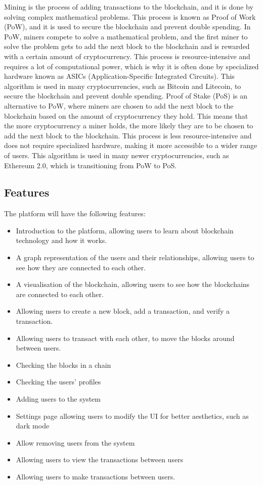 \documentclass[12pt, a4paper]{article}
\begin{document}
Mining is the process of adding transactions to the blockchain, and it is done by solving complex mathematical problems.
This process is known as Proof of Work (PoW), and it is used to secure the blockchain and prevent double spending.
In PoW, miners compete to solve a mathematical problem, and the first miner to solve the problem gets to add the next block to the blockchain and is rewarded with a certain amount of cryptocurrency.
This process is resource-intensive and requires a lot of computational power, which is why it is often done by specialized hardware known as ASICs (Application-Specific Integrated Circuits). 
This algorithm is used in many cryptocurrencies, such as Bitcoin and Litecoin, to secure the blockchain and prevent double spending.
Proof of Stake (PoS) is an alternative to PoW, where miners are chosen to add the next block to the blockchain based on the amount of cryptocurrency they hold.
This means that the more cryptocurrency a miner holds, the more likely they are to be chosen to add the next block to the blockchain.
This process is less resource-intensive and does not require specialized hardware, making it more accessible to a wider range of users.
This algorithm is used in many newer cryptocurrencies, such as Ethereum 2.0, which is transitioning from PoW to PoS.


\newpage
\subsection{Features}
The platform will have the following features:
\begin{itemize}
    \item Introduction to the platform, allowing users to learn about blockchain technology and how it works.
    \item A graph representation of the users and their relationships, allowing users to see how they are connected to each other.
    \item A visualisation of the blockchain, allowing users to see how the blockchains are connected to each other.
    \item Allowing users to create a new block, add a transaction, and verify a transaction.
    \item Allowing users to transact with each other, to move the blocks around between users.
    \item Checking the blocks in a chain
    \item Checking the users' profiles
    \item Adding users to the system
    \item Settings page allowing users to modify the UI for better aesthetics, such as dark mode
    \item Allow removing users from the system
    \item Allowing users to view the transactions between users
    \item Allowing users to make transactions between users.
\end{itemize}
\newpage
\end{document}
